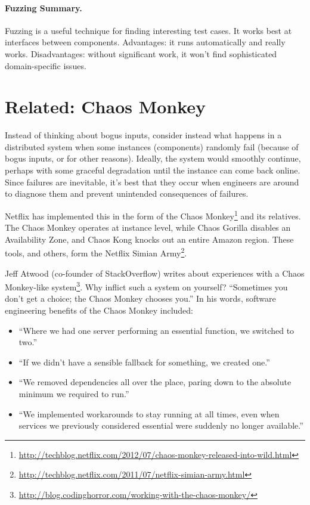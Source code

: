 \documentclass[11pt]{article}
\begin{document}


\paragraph{Fuzzing Summary.} Fuzzing is a useful technique for finding
interesting test cases. It works best at interfaces between components.
Advantages: it runs automatically and really works. Disadvantages: without
significant work, it won't find sophisticated domain-specific issues.

\section*{Related: Chaos Monkey}
Instead of thinking about bogus inputs, consider instead what happens
in a distributed system when some instances (components) randomly fail
(because of bogus inputs, or for other reasons). Ideally, the system
would smoothly continue, perhaps with some graceful degradation until
the instance can come back online. Since failures are inevitable, it's
best that they occur when engineers are around to diagnose them and
prevent unintended consequences of failures.

Netflix has implemented this in the form of the Chaos
Monkey\footnote{\url{http://techblog.netflix.com/2012/07/chaos-monkey-released-into-wild.html}}
and its relatives. The Chaos Monkey operates at instance level, while
Chaos Gorilla disables an Availability Zone, and Chaos Kong knocks out
an entire Amazon region. These tools, and others, form the Netflix
Simian
Army\footnote{\url{http://techblog.netflix.com/2011/07/netflix-simian-army.html}}.

Jeff Atwood (co-founder of StackOverflow) writes about experiences with a Chaos Monkey-like system\footnote{\url{http://blog.codinghorror.com/working-with-the-chaos-monkey/}}. Why inflict such a system on yourself? ``Sometimes you don't get a choice; the Chaos Monkey chooses you.'' In his words, software engineering benefits of the Chaos Monkey included:

\begin{itemize}
\item    ``Where we had one server performing an essential function, we switched to two.''
\item    ``If we didn't have a sensible fallback for something, we created one.''
\item    ``We removed dependencies all over the place, paring down to the absolute minimum we required to run.''
\item     ``We implemented workarounds to stay running at all times, even when services we previously considered essential were suddenly no longer available.''
\end{itemize}
\end{document}
